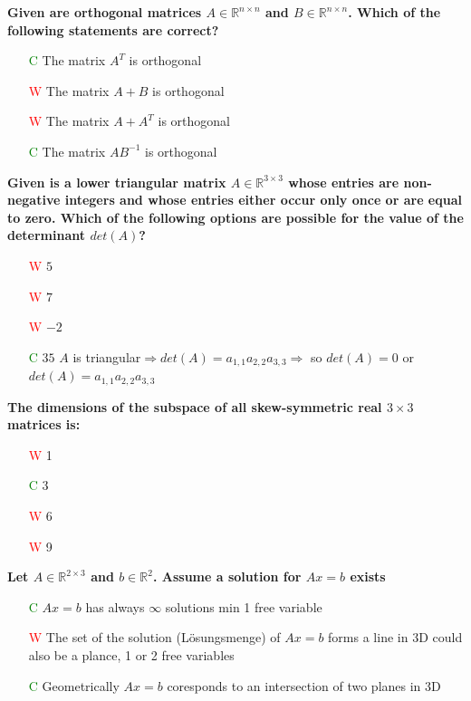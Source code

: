 \documentclass[7pt,landscape, margin = 0.1mm]{article}
\begin{document}
\begin{multicols}{4}
\begin{flushleft}
\begin{itemize}
\end{itemize}
\hspace{3mm}

\textbf{Given are orthogonal matrices $A  \in \mathbb{R}^{n \times n} $ and $B  \in \mathbb{R}^{n \times n} $. Which of the following statements are
correct?  }
\begin{itemize}
\item[\textcolor{green}{C}] The matrix $A^T$ is orthogonal
\item[\textcolor{red}{W}] The matrix $A + B$ is orthogonal
\item[\textcolor{red}{W}]  The matrix $A + A^T$ is orthogonal
\item[\textcolor{green}{C}] The matrix $AB^{-1}$ is orthogonal 
 
\end{itemize}
\hspace{3mm}

\textbf{Given is a lower triangular matrix $A  \in \mathbb{R}^{3 \times 3} $ whose entries are non-negative integers and whose
entries either occur only once or are equal to zero. Which of the following options are possible for the
value of the determinant $det(A)$? }
\begin{itemize}
\item[\textcolor{red}{W}]$ 5$
\item[\textcolor{red}{W}]  $7$
\item[\textcolor{red}{W}] $ -2$
\item[\textcolor{green}{C}]  $35$
\textcolor{Emerald}{ $A$ is triangular$\Rightarrow det(A)= a_{1,1}a_{2,2} a_{3,3} \Rightarrow $ so  $det(A) = 0$ or $det(A)= a_{1,1}a_{2,2} a_{3,3}  $} 
\end{itemize}
\hspace{3mm}
\textbf{The dimensions of the subspace of all skew-symmetric real $3 \times 3 $ matrices is:}
\begin{itemize}
\item[\textcolor{red}{W}] 1
\item[\textcolor{green}{C}] 3
\item[\textcolor{red}{W}] 6 
\item[\textcolor{red}{W}] 9
\textcolor{Emerald}{}
\end{itemize}
\hspace{3mm}
\textbf{Let $A  \in \mathbb{R}^{2 \times 3} $ and $b  \in \mathbb{R}^2$. Assume a solution for $Ax=b $ exists}
\begin{itemize}
\item[\textcolor{green}{C}] $Ax =  b $ has always $\infty $ solutions
\textcolor{Emerald}{min 1 free variable}
\item[\textcolor{red}{W}] The set of the solution (Lösungsmenge) of $Ax=b$ forms a line in 3D
\textcolor{Emerald}{could also be a plance, 1 or 2 free variables}
\item[\textcolor{green}{C}] Geometrically $Ax=b$ coresponds to an intersection of two planes in 3D


\end{itemize}
\end{flushleft}
\end{multicols}
\end{document}
